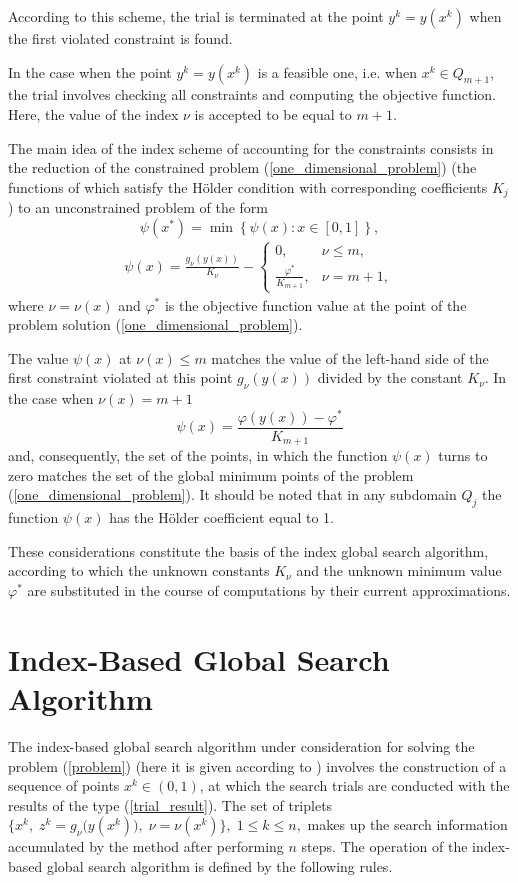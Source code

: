 \documentclass[twocolumn]{svjour3}          %
\begin{document}
	According to this scheme, the trial is terminated at the point $y^k=y(x^k)$ when the first violated constraint  is found.
	
	In the case when the point $y^k = y(x^k)$ is a feasible one, i.e. when $x^k \in Q_{m+1}$, the trial involves checking all constraints and computing the objective function. Here, the value of the index $\nu$ is accepted to be equal to $m+1$.
	
	The main idea of the index scheme of accounting for the constraints consists in the reduction of the constrained problem (\ref{one_dimensional_problem}) (the functions of which satisfy the H\"{o}lder condition with corresponding coefficients $K_j$) to an unconstrained problem of the form
\begin{equation}\label{reduction_problem}
	\psi(x^*)=\min \left\{\psi(x): x \in [0,1] \right\},
\end{equation}
\begin{eqnarray*}
	\psi(x)=\frac{g_{\nu}(y(x))}{K_{\nu}} - 
	\left\{
   \begin{array}{lr}
     0, & \nu \leq m,\\
     \frac{\varphi^\ast}{K_{m+1}}, & \nu = m + 1,
   \end{array}
	\right.
\end{eqnarray*}
where $\nu = \nu(x)$ and $\varphi^\ast$ is the objective function value at the point of the problem solution (\ref{one_dimensional_problem}).

	The value $\psi(x)$ at $\nu(x) \leq m$ matches the value of the left-hand side of the first constraint violated at this point $g_{\nu}(y(x))$ divided by the constant $K_{\nu}$. In the case when $\nu(x) = m+1$ 
$$
	\psi(x)=\frac{\varphi(y(x))-\varphi^\ast}{K_{m+1}}
$$
and, consequently, the set of the points, in which the function $\psi(x)$ turns to zero matches the set of the global minimum points of the problem (\ref{one_dimensional_problem}). It should be noted that in any subdomain $Q_j$ the function $\psi(x)$ has the H\"{o}lder coefficient equal to 1.
	
	These considerations constitute the basis of the index global search algorithm, according to which the unknown constants $K_{\nu}$ and the unknown minimum value $\varphi^\ast$ are substituted in the course of computations by their current approximations.



\section{Index-Based Global Search Algorithm}
\label{sec:3}
	The index-based global search algorithm under consideration for solving the problem (\ref{problem}) (here it is given according to \cite{Strongin2000}) involves the construction of a sequence of points $x^k \in (0,1)$, at which the search trials are conducted with the results of the type (\ref{trial_result}). The set of triplets 
$\{x^k,\; z^k=g_{\nu}\big(y(x^k)\big),\; \nu=\nu(x^k)\},\; 1 \leq k \leq n,$
makes up the search information accumulated by the method after performing $n$ steps. The operation of the index-based global search algorithm is defined by the following rules.
	
\end{document}
